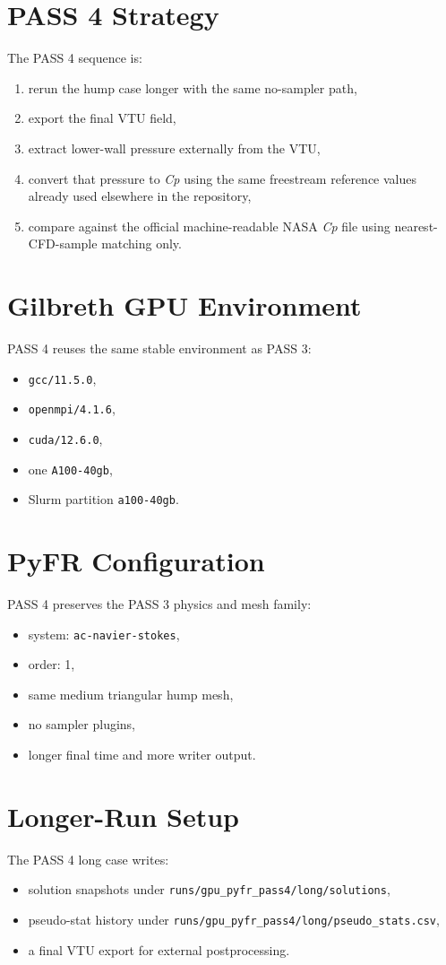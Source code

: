 \documentclass[11pt]{article}
\begin{document}
\section{PASS 4 Strategy}
The PASS 4 sequence is:
\begin{enumerate}
  \item rerun the hump case longer with the same no-sampler path,
  \item export the final VTU field,
  \item extract lower-wall pressure externally from the VTU,
  \item convert that pressure to \textit{Cp} using the same freestream reference values already used elsewhere in the repository,
  \item compare against the official machine-readable NASA \textit{Cp} file using nearest-CFD-sample matching only.
\end{enumerate}

\section{Gilbreth GPU Environment}
PASS 4 reuses the same stable environment as PASS 3:
\begin{itemize}
  \item \texttt{gcc/11.5.0},
  \item \texttt{openmpi/4.1.6},
  \item \texttt{cuda/12.6.0},
  \item one \texttt{A100-40gb},
  \item Slurm partition \texttt{a100-40gb}.
\end{itemize}

\section{PyFR Configuration}
PASS 4 preserves the PASS 3 physics and mesh family:
\begin{itemize}
  \item system: \texttt{ac-navier-stokes},
  \item order: 1,
  \item same medium triangular hump mesh,
  \item no sampler plugins,
  \item longer final time and more writer output.
\end{itemize}

\section{Longer-Run Setup}
The PASS 4 long case writes:
\begin{itemize}
  \item solution snapshots under \texttt{runs/gpu\_pyfr\_pass4/long/solutions},
  \item pseudo-stat history under \texttt{runs/gpu\_pyfr\_pass4/long/pseudo\_stats.csv},
  \item a final VTU export for external postprocessing.
\end{itemize}
\end{document}
